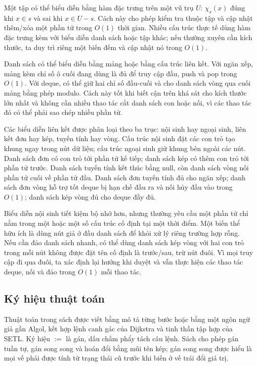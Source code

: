 \documentclass[11pt]{article}
\begin{document}
Một tập có thể biểu diễn bằng hàm đặc trưng trên một vũ trụ \(U\):
\(\chi_s(x)\) đúng khi \(x\in s\) và sai khi \(x\in U-s\). Cách này cho phép
kiểm tra thuộc tập và cập nhật thêm/xóa một phần tử trong \(O(1)\) thời gian.
Nhiều cấu trúc thực tế dùng hàm đặc trưng kèm với biểu diễn danh sách hoặc tập
khác; nếu thường xuyên cần kích thước, ta duy trì riêng một biến đếm và cập
nhật nó trong \(O(1)\).

Danh sách có thể biểu diễn bằng mảng hoặc bằng cấu trúc liên kết. Với ngăn xếp,
mảng kèm chỉ số ô cuối đang dùng là đủ để truy cập đầu, push và pop trong
\(O(1)\). Với deque, có thể giữ hai chỉ số đầu-cuối và cho danh sách vòng qua
cuối mảng bằng phép modulo. Cách này tốt khi biết cận trên khá sát cho kích
thước lớn nhất và không cần nhiều thao tác cắt danh sách con hoặc nối, vì các
thao tác đó có thể phải sao chép nhiều phần tử.

Các biểu diễn liên kết được phân loại theo ba trục: nội sinh hay ngoại sinh,
liên kết đơn hay kép, tuyến tính hay vòng. Cấu trúc nội sinh đặt các con trỏ
tạo khung ngay trong nút dữ liệu; cấu trúc ngoại sinh giữ khung bên ngoài các
nút. Danh sách đơn có con trỏ tới phần tử kế tiếp; danh sách kép có thêm con
trỏ tới phần tử trước. Danh sách tuyến tính kết thúc bằng null, còn danh sách
vòng nối phần tử cuối về phần tử đầu. Danh sách đơn tuyến tính đủ cho ngăn xếp;
danh sách đơn vòng hỗ trợ tốt deque bị hạn chế đầu ra và nối hủy đầu vào trong
\(O(1)\); danh sách kép vòng đủ cho deque đầy đủ.

Biểu diễn nội sinh tiết kiệm bộ nhớ hơn, nhưng thường yêu cầu một phần tử chỉ
nằm trong một hoặc một số cấu trúc cố định tại một thời điểm. Một biến thể hữu
ích là dùng nút giả ở đầu danh sách để khỏi xử lý riêng trường hợp rỗng. Nếu cần
đảo danh sách nhanh, có thể dùng danh sách kép vòng với hai con trỏ trong mỗi
nút không được đặt tên cố định là trước/sau, trừ nút đuôi. Vì mọi truy cập đi
qua đuôi, ta xác định lại hướng khi duyệt và vẫn thực hiện các thao tác deque,
nối và đảo trong \(O(1)\) mỗi thao tác.

\subsection*{Ký hiệu thuật toán}

Thuật toán trong sách được viết bằng mô tả từng bước hoặc bằng một ngôn ngữ
giả gần Algol, kết hợp lệnh canh gác của Dijkstra và tinh thần tập hợp của SETL.
Ký hiệu \(:=\) là gán, dấu chấm phẩy tách câu lệnh. Sách cho phép gán tuần tự,
gán song song và hoán đổi bằng mũi tên kép; gán song song được hiểu là mọi vế
phải được tính từ trạng thái cũ trước khi biến ở vế trái đổi giá trị.
\end{document}
